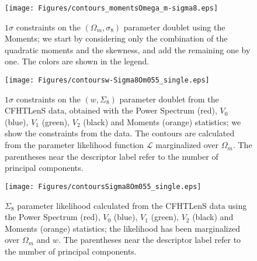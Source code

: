 \documentclass[reprint,aps,prd,superscriptaddress,showkeys,showpacs]{revtex4-1}
\begin{document}
\begin{figure}
\begin{center}
\texttt{[image: Figures/contours\_momentsOmega\_m-sigma8.eps]}
\end{center}
\caption{$1\sigma$ constraints on the $(\Omega_m,\sigma_8)$ parameter doublet using the Moments; we start by considering only the combination of the quadratic moments and the skewness, and add the remaining one by one. The colors are shown in the legend.}
\label{contoursMoments}
\end{figure}

\begin{figure}
\begin{center}
\texttt{[image: Figures/contoursw-Sigma8Om055\_single.eps]}
\end{center}
\caption{$1\sigma$ constraints on the $(w,\Sigma_8)$ parameter doublet from the CFHTLenS data, obtained with the Power Spectrum (red), $V_0$ (blue), $V_1$ (green), $V_2$ (black) and Moments (orange) statistics; we show the constraints from the data. The contours are calculated from the parameter likelihood function $\mathcal{L}$ marginalized over $\Omega_m$. The parentheses near the descriptor label refer to the number of principal components.}
\label{contours3singleRep}
\end{figure}

\begin{figure}
\begin{center}
\texttt{[image: Figures/contoursSigma8Om055\_single.eps]}
\end{center}
\caption{$\Sigma_8$ parameter likelihood calculated from the CFHTLenS data using the Power Spectrum (red), $V_0$ (blue), $V_1$ (green), $V_2$ (black) and Moments (orange) statistics; the likelihood has been marginalized over $\Omega_m$ and $w$. The parentheses near the descriptor label refer to the number of principal components.}
\label{likelihoodSi8single}
\end{figure}
\end{document}
